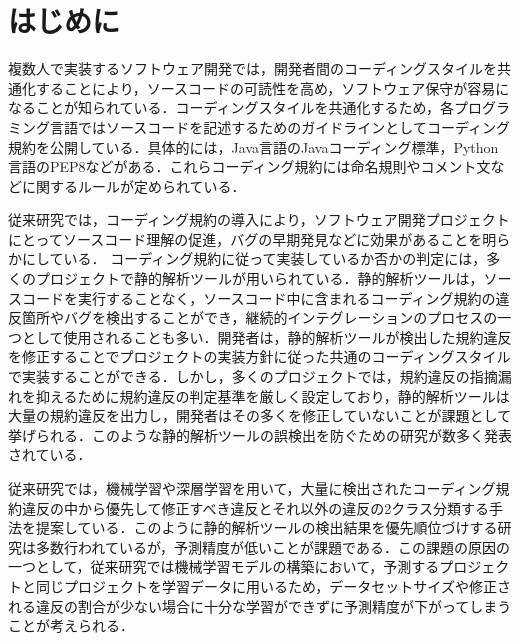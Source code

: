 \documentclass[T,J]{fose} %
\newcommand{\todo}[1]{\colorbox{yellow}{{\bf TODO}:}{\color{red} {\textbf{[#1]}}}}
\begin{document}
\section{はじめに}

複数人で実装するソフトウェア開発では，開発者間のコーディングスタイルを共通化することにより，ソースコードの可読性を高め，ソフトウェア保守が容易になることが知られている\cite{EffectsSAT}．コーディングスタイルを共通化するため，各プログラミング言語ではソースコードを記述するためのガイドラインとしてコーディング規約を公開している．具体的には，Java言語のJavaコーディング標準，Python言語のPEP8などがある．これらコーディング規約には命名規則やコメント文などに関するルールが定められている．

従来研究では，コーディング規約の導入により，ソフトウェア開発プロジェクトにとってソースコード理解の促進，バグの早期発見などに効果があることを明らかにしている\cite{Beller2}\cite{Johnson}\cite{Beller}．
コーディング規約に従って実装しているか否かの判定には，多くのプロジェクトで静的解析ツールが用いられている．静的解析ツールは，ソースコードを実行することなく，ソースコード中に含まれるコーディング規約の違反箇所やバグを検出することができ，継続的インテグレーションのプロセスの一つとして使用されることも多い．開発者は，静的解析ツールが検出した規約違反を修正することでプロジェクトの実装方針に従った共通のコーディングスタイルで実装することができる．しかし，多くのプロジェクトでは，規約違反の指摘漏れを抑えるために規約違反の判定基準を厳しく設定しており，静的解析ツールは大量の規約違反を出力し，開発者はその多くを修正していないことが課題として挙げられる．このような静的解析ツールの誤検出を防ぐための研究が数多く発表されている\cite{Nguyen}．

従来研究では，機械学習や深層学習を用いて，大量に検出されたコーディング規約違反の中から優先して修正すべき違反とそれ以外の違反の2クラス分類する手法を提案している．このように静的解析ツールの検出結果を優先順位づけする研究は多数行われているが，予測精度が低いことが課題である．この課題の原因の一つとして，従来研究では機械学習モデルの構築において，予測するプロジェクトと同じプロジェクトを学習データに用いるため，データセットサイズや修正される違反の割合が少ない場合に十分な学習ができずに予測精度が下がってしまうことが考えられる．
\end{document}
